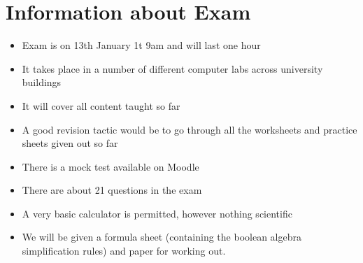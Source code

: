 
\section*{Information about Exam}
\begin{itemize}
    \item Exam is on 13th January 1t 9am and will last one hour
    \item It takes place in a number of different computer labs across university buildings
    \item It will cover all content taught so far
    \item A good revision tactic would be to go through all the worksheets and practice sheets given out so far
    \item There is a mock test available on Moodle 
    \item There are about 21 questions in the exam
    \item A very basic calculator is permitted, however nothing scientific
    \item We will be given a formula sheet (containing the boolean algebra simplification rules) and paper for working out. 
\end{itemize}